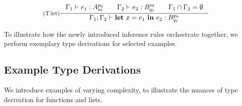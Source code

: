 
\[
   \label{def:t-let-6}
   \inference[(T:let)]
   {
      \typing
      {\Gamma_1}
      {e_1}
      {\ratype{A}{p_0}{m}} 
         \qquad 
      \typing
      {\Gamma_2}
      {e_2}
      {\ratype{B}{m}{q_1}}
         \qquad 
      \Gamma_1 \cap \Gamma_2 = \emptyset
   }
   {\typing{\Gamma_1; \Gamma_2}{\letexp{x}{e_1}{e_2}}{\ratype{B}{p_0}{q_1}}}
\]

To illustrate how the newly introduced inference rules orchestrate together, we perform exemplary type derivations for selected examples.

\subsection{Example Type Derivations}

We introduce examples of varying complexity, to illustrate the nuances of type derivation for functions and lists. 

